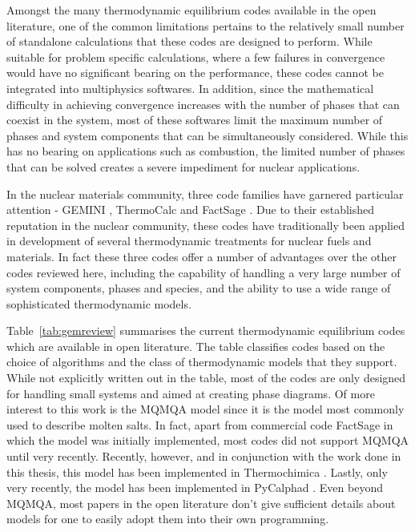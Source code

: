 	Amongst the many thermodynamic equilibrium codes available in the open literature, one of the common limitations pertains to the relatively small number of standalone calculations that these codes are designed to perform. While suitable for problem specific calculations, where a few failures in convergence would have no significant bearing on the performance, these codes cannot be integrated into multiphysics softwares. In addition, since the mathematical difficulty in achieving convergence increases with the number of phases that can coexist in the system, most of these softwares  limit the maximum number of phases and system components that can be simultaneously considered. While this has no bearing on applications such as combustion, the limited number of phases that can be solved creates a severe impediment for nuclear applications.

	In the nuclear materials community, three code families have garnered particular attention - GEMINI \cite{Cheynet09}, ThermoCalc \cite{ANDERSSON2002273} and FactSage \cite{Bale02}. Due to their established reputation in the nuclear community, these codes have traditionally been applied in development of several thermodynamic treatments for nuclear fuels and materials. In fact these three codes offer a number of advantages over the other codes reviewed here, including the capability of handling a very large number of system components, phases and species, and the ability to use a wide range of sophisticated thermodynamic models.

    Table~\ref{tab:gemreview} summarises the current thermodynamic equilibrium codes which are available in open literature. The table classifies codes based on the choice of algorithms and the class of thermodynamic models that they support. While not explicitly written out in the table, most of the codes are only designed for handling small systems and aimed at creating phase diagrams. Of more interest to this work is the MQMQA model since it is the model most commonly used to describe molten salts. In fact, apart from commercial code FactSage in which the model was initially implemented, most codes did not support MQMQA until very recently. Recently, however, and in conjunction with the work done in this thesis, this model has been implemented in Thermochimica \cite{Poschmann:2021ab}. Lastly, only very recently, the model has been implemented in PyCalphad \cite{Palma:2022aa}. Even beyond MQMQA, most papers in the open literature don’t give sufficient details about models for one to easily adopt them into their own programming.
	
